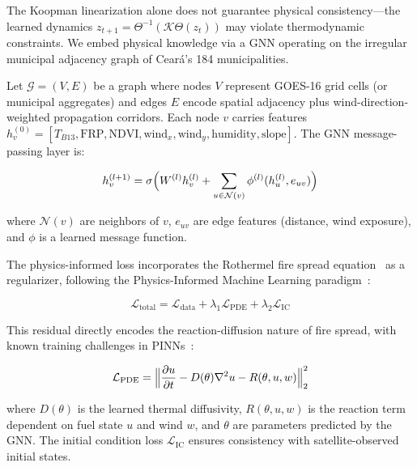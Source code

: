 \documentclass[5p,twocolumn]{elsarticle}
\newcommand{\abbrev}[1]{{\small\textsc{#1}}}
\newcommand{\sK}{\mathcal{K}}
\newcommand{\sG}{\mathcal{G}}
\begin{document}
The Koopman linearization alone does not guarantee physical consistency---the learned dynamics $z_{t+1} = \Theta^{-1}(\sK \Theta(z_t))$ may violate thermodynamic constraints. We embed physical knowledge via a \abbrev{GNN} operating on the irregular municipal adjacency graph of Cear\'{a}'s 184 municipalities.

Let $\sG = (V, E)$ be a graph where nodes $V$ represent GOES-16 grid cells (or municipal aggregates) and edges $E$ encode spatial adjacency plus wind-direction-weighted propagation corridors. Each node $v$ carries features $h_v^{(0)} = [T_{B13}, \text{FRP}, \text{NDVI}, \text{wind}_x, \text{wind}_y, \text{humidity}, \text{slope}]$. The \abbrev{GNN} message-passing layer is:

\begin{equation}
h_v^{(l+1)} = \sigma\Bigl(W^{(l)} h_v^{(l)} + \sum_{u \in \mathcal{N}(v)} \phi^{(l)}(h_u^{(l)}, e_{uv})\Bigr)
\label{eq:gnn_message}
\end{equation}

where $\mathcal{N}(v)$ are neighbors of $v$, $e_{uv}$ are edge features (distance, wind exposure), and $\phi$ is a learned message function.

The physics-informed loss incorporates the Rothermel fire spread equation~\cite{rothermel1983} as a regularizer, following the Physics-Informed Machine Learning paradigm~\cite{karniadakis2021,cuomo2022}:

\begin{equation}
\mathcal{L}_{\text{total}} = \mathcal{L}_{\text{data}} + \lambda_1 \mathcal{L}_{\text{PDE}} + \lambda_2 \mathcal{L}_{\text{IC}}
\label{eq:pinn_loss}
\end{equation}

This residual directly encodes the reaction-diffusion nature of fire spread, with known training challenges in PINNs~\cite{wang2021_gradient,krishnapriyan2021}:

\begin{equation}
\mathcal{L}_{\text{PDE}} = \Bigl\| \frac{\partial u}{\partial t} - D(\theta) \nabla^2 u - R(\theta, u, w) \Bigr\|_2^2
\label{eq:pde_residual}
\end{equation}

where $D(\theta)$ is the learned thermal diffusivity, $R(\theta, u, w)$ is the reaction term dependent on fuel state $u$ and wind $w$, and $\theta$ are parameters predicted by the \abbrev{GNN}. The initial condition loss $\mathcal{L}_{\text{IC}}$ ensures consistency with satellite-observed initial states.
\end{document}
